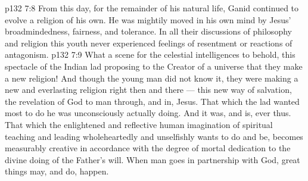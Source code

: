 \vs p132 7:8 From this day, for the remainder of his natural life, Ganid continued to evolve a religion of his own. He was mightily moved in his own mind by Jesus’ broadmindedness, fairness, and tolerance. In all their discussions of philosophy and religion this youth never experienced feelings of resentment or reactions of antagonism.
\vs p132 7:9 \pc What a scene for the celestial intelligences to behold, this spectacle of the Indian lad proposing to the Creator of a universe that they make a new religion! And though the young man did not know it, they were making a new and everlasting religion right then and there --- this new way of salvation, the revelation of God to man through, and in, Jesus. That which the lad wanted most to do he was unconsciously actually doing. And it was, and is, ever thus. That which the enlightened and reflective human imagination of spiritual teaching and leading wholeheartedly and unselfishly wants to do and be, becomes measurably creative in accordance with the degree of mortal dedication to the divine doing of the Father’s will. When man goes in partnership with God, great things may, and do, happen.
\quizlink
